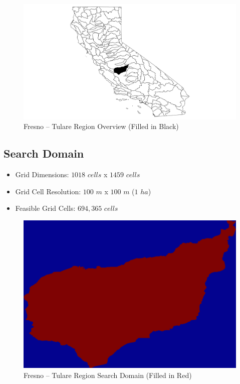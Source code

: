         \begin{figure}[!h]
            \begin{center}
            \includegraphics[width=5.5in]{figures/Fresno_Overview.png}   
            \caption{Fresno -- Tulare Region Overview (Filled in Black)}
            \label{fig:Foverview}
            \end{center}
        \end{figure}

    \subsection{Search Domain}
    
    \begin{itemize}
      \setlength{\itemsep}{0cm}
      \setlength{\parskip}{0cm}
        \item Grid Dimensions: $1018$ $cells$ x $1459$ $cells$
        \item Grid Cell Resolution: $100$ $m$ x $100$ $m$ ($1$ $ha$)
        \item Feasible Grid Cells: $694,365$ $cells$
    \end{itemize}
    
        \begin{figure}[!h]
            \begin{center}
            \includegraphics[width=5.5in]{figures/Fresno_SearchDomain.png}   
            \caption{Fresno -- Tulare Region Search Domain (Filled in Red)}
            \label{fig:Fdomain}
            \end{center}
        \end{figure}
        

